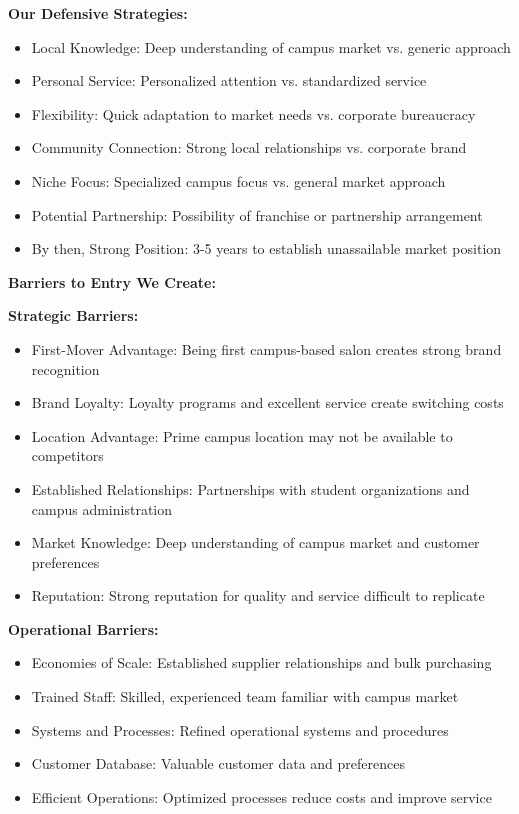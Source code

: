 \documentclass[a4paper,12pt]{article}
\begin{document}
\textbf{Our Defensive Strategies:}
\begin{itemize}[leftmargin=2em]
    \item Local Knowledge: Deep understanding of campus market vs. generic approach
    \item Personal Service: Personalized attention vs. standardized service
    \item Flexibility: Quick adaptation to market needs vs. corporate bureaucracy
    \item Community Connection: Strong local relationships vs. corporate brand
    \item Niche Focus: Specialized campus focus vs. general market approach
    \item Potential Partnership: Possibility of franchise or partnership arrangement
    \item By then, Strong Position: 3-5 years to establish unassailable market position
\end{itemize}

\vspace{1em}

\textbf{Barriers to Entry We Create:}

\textbf{Strategic Barriers:}
\begin{itemize}[leftmargin=2em]
    \item First-Mover Advantage: Being first campus-based salon creates strong brand recognition
    \item Brand Loyalty: Loyalty programs and excellent service create switching costs
    \item Location Advantage: Prime campus location may not be available to competitors
    \item Established Relationships: Partnerships with student organizations and campus administration
    \item Market Knowledge: Deep understanding of campus market and customer preferences
    \item Reputation: Strong reputation for quality and service difficult to replicate
\end{itemize}

\textbf{Operational Barriers:}
\begin{itemize}[leftmargin=2em]
    \item Economies of Scale: Established supplier relationships and bulk purchasing
    \item Trained Staff: Skilled, experienced team familiar with campus market
    \item Systems and Processes: Refined operational systems and procedures
    \item Customer Database: Valuable customer data and preferences
    \item Efficient Operations: Optimized processes reduce costs and improve service
\end{itemize}
\end{document}
